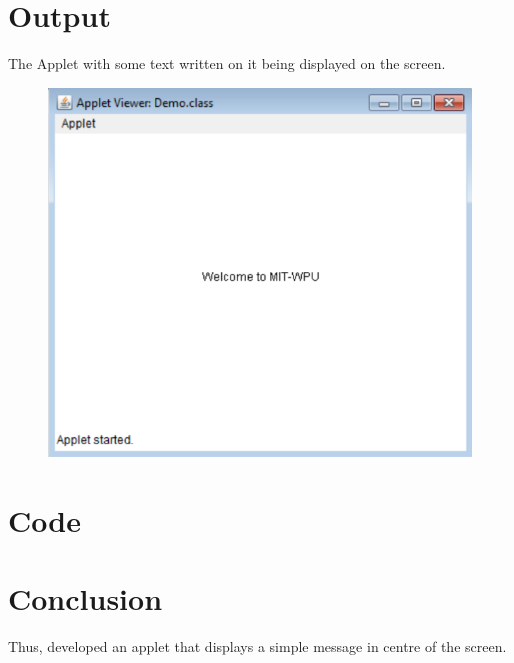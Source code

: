 \documentclass[11pt]{article}
\begin{document}
\section{Output}
The Applet with some text written on it being displayed on the screen.
\begin{figure}[H]
	\centering
	\includegraphics[scale=0.7]{applet.png}
	\caption{}
\end{figure}

\section{Code}




\section{Conclusion}
Thus, developed an applet that displays a simple message in centre of the screen.

\pagebreak
\end{document}
